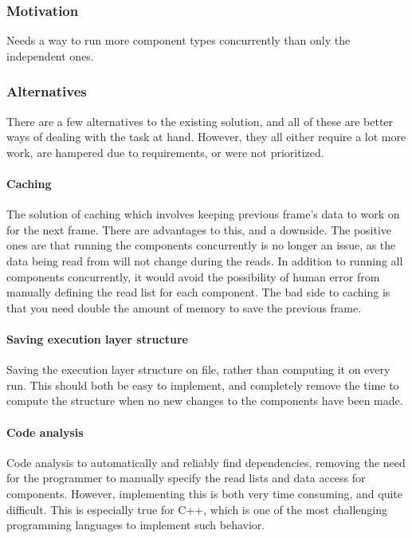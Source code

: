 \subsubsection{Motivation}
Needs a way to run more component types concurrently than only the independent ones.

\subsubsection{Alternatives}
There are a few alternatives to the existing solution, and all of these are better ways of dealing with the task at hand.
However, they all either require a lot more work, are hampered due to requirements, or were not prioritized.

\paragraph{Caching}
The solution of caching which involves keeping previous frame's data to work on for the next frame.
There are advantages to this, and a downside.
The positive ones are that running the components concurrently is no longer an issue, as the data being read from will not change during the reads.
In addition to running all components concurrently, it would avoid the possibility of human error from manually defining the read list for each component.
The bad side to caching is that you need double the amount of memory to save the previous frame.

\paragraph{Saving execution layer structure}
Saving the execution layer structure on file, rather than computing it on every run.
This should both be easy to implement, and completely remove the time to compute the structure when no new changes to the components have been made.

\paragraph{Code analysis}
\label{par:detailed_execution_layers_code_analysis}
Code analysis to automatically and reliably find dependencies, removing the need for the programmer to manually specify the read lists and data access for components.
However, implementing this is both very time consuming, and quite difficult.
This is especially true for C++, which is one of the most challenging programming languages to implement such behavior.

